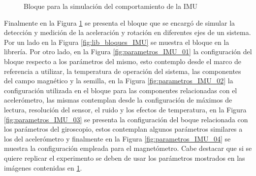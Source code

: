 \begin{figure}[htbp]
    \caption{Bloque para la simulación del comportamiento de la IMU}
    \label{fig:arreglo_imu}
\end{figure}


Finalmente en la Figura \ref{fig:arreglo_imu} se presenta el bloque que se encargó de simular la detección y medición de la aceleración y rotación en diferentes ejes de un sistema. Por un lado en la Figura \ref{fig:lib_bloques_IMU} se muestra el bloque en la librería. Por otro lado, en la Figura \ref{fig:parametros_IMU_01} la configuración del bloque respecto a los parámetros del mismo, esto contemplo desde el marco de referencia a utilizar, la temperatura de operación del sistema, las componentes del campo magnético y la semilla, en la Figura \ref{fig:parametros_IMU_02} la configuración utilizada en el bloque para las componentes relacionadas con el acelerómetro, las mismas contemplan desde la configuración de máximos de lectura, resolución del sensor, el ruido y los efectos de temperatura, en la Figura \ref{fig:parametros_IMU_03} se presenta la configuración del boque relacionada con los parámetros del giroscopio, estos contemplan algunos parámetros similares a los del acelerómetro y finalmente en la Figura \ref{fig:parametros_IMU_04} se muestra la configuración empleada para el magnetómetro. Cabe destacar que si se quiere replicar el experimento se deben de usar los parámetros mostrados en las imágenes contenidas en \ref{fig:arreglo_imu}. 


